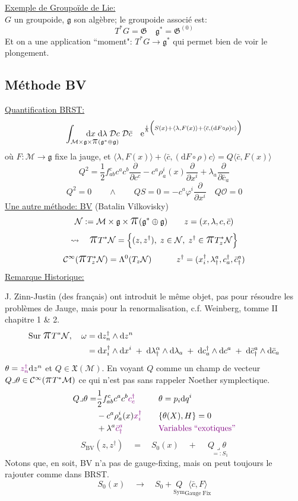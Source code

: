 \documentclass[a4paper,11pt]{article}
\renewcommand{\d}{{\mathrm{d}}}
\newcommand{\D}{{\mathcal{D}}}
\newcommand{\e}{{\mathrm{e}}}
\newcommand{\dr}[2]{\frac{\partial {#1}}{\partial{#2}}}
\newcommand{\ppi}{{\mathlarger{\mathlarger{\mathlarger{\pi}}}}}
\begin{document}
\noindent\underline{Exemple de Groupoïde de Lie:}\\
$G$ un groupoide, $\mathfrak{g}$ son algèbre; le groupoide associé est:
$$T^*G = \mathfrak{G} \quad \mathfrak{g}^*=\mathfrak{G}^{(0)}$$
Et on a une application ``moment": $T^*G \to \mathfrak{g}^*$ qui permet bien de voir le plongement.

\subsection{Méthode BV}
\underline{Quantification BRST:}
$$\int_{\mathcal M \times \mathfrak g \times \ppi(\mathfrak g^* \oplus \mathfrak g)}\!\!\!\!\!\!\!\!\!\!\!\!\!\!\!\!\!\!\!\!\!\!\!\!\!\d x\; \d\lambda\; \D c\; \D\bar c \quad \e^{\frac i\hbar \Big(S(x)+\langle\lambda,F(x)\rangle+\langle\bar c, (\d F\circ \rho) c\rangle\Big)}$$
où $F:\mathcal{M}\to\mathfrak g$ fixe la jauge, et $\langle\lambda,F(x)\rangle+\langle\bar c, (\d F\circ \rho) c\rangle = Q\langle\bar c, F(x)\rangle$
$$Q^2 = \frac12 f^c_{ab}c^ac^b\dr{}{c^c} - c^a\rho^i_a(x) \dr{}{x^i}+\lambda_a \dr{}{\bar c_a}$$
$$Q^2 = 0 \quad \quad \wedge \quad \quad QS=0=-c^a\varphi^i\dr{}{x^i} \quad Q\mathcal{O}=0$$
\underline{Une autre méthode: BV} (Batalin Vilkovisky)
$$\mathcal N := \mathcal{M}\times\mathfrak g \times \ppi(\mathfrak g^* \oplus \mathfrak g) \quad \quad z=(x,\lambda,c,\bar c)$$
$$\rightsquigarrow \quad \ppi T^*\mathcal N = \Big\{ (z,z^\dag), \; z\in\mathcal N, \; z^\dag\in\ppi T^*_z\mathcal N\Big\}$$
$$\mathcal C^\infty (\ppi T^*_z\mathcal N) = \Lambda^0 (T_z\mathcal N) \quad \quad \quad
z^\dag = (x_i^\dag, \lambda^a_\dag, c_a^\dag, \bar c_\dag^a)$$
\underline{Remarque Historique:}

J. Zinn-Justin (des français) ont introduit le même objet, pas pour résoudre les problèmes de Jauge, mais pour la renormalisation, c.f. Weinberg, tomme II chapitre 1 \& 2.
\begin{align*}
\mathrm{Sur}\;\ppi T^*\mathcal N, \quad \omega &= \d z^\dag_n \wedge \d z^n\\
&= \d x^\dag_i\wedge \d x^i \;+\; \d \lambda^\alpha_\dag \wedge \d \lambda_a \;+\; \d c^\dag_a\wedge \d c^a \;+\; \d\bar c^a_\dag \wedge \d \bar c_a
\end{align*}
$\theta = \color{violet}z^\dag_n\color{black}\d z^n$ et $Q\in\mathfrak{X}(\mathcal{M})$. En voyant $Q$ comme un champ de vecteur $Q\lrcorner \theta\in\mathcal{C}^\infty(\ppi T^*\mathcal{M})$ ce qui n'est pas sans rappeler Noether symplectique.
\begin{align*}
Q\lrcorner\theta =& \frac12 f^c_{ab}c^ac^b\color{violet}c^\dag_c &&&& \theta = p_i\d q^i\\
&-c^a\rho^i_a(x)\color{violet}x^\dag_i &&&& \{\theta(X),H\}=0\\
&+\lambda^a\color{violet}\bar c^a_\dag &&&& \color{violet}\mathrm{Variables}\;``\mathrm{exotiques}"\color{black}
\end{align*}
$$S_\mathrm{BV}(z,z^\dag) \quad = \quad S_0(x) \quad + \quad \underset{\quad =:S_1}{Q\lrcorner\theta}$$
Notons que, en soit, BV n'a pas de gauge-fixing, mais on peut toujours le rajouter comme dans BRST.
$$S_0(x) \quad \longrightarrow \quad S_0 + \underset{\mathrm{Sym}}Q\underset{\mathrm{Gauge}\;\mathrm{Fix}}{\langle\bar c, F\rangle}$$
\end{document}
